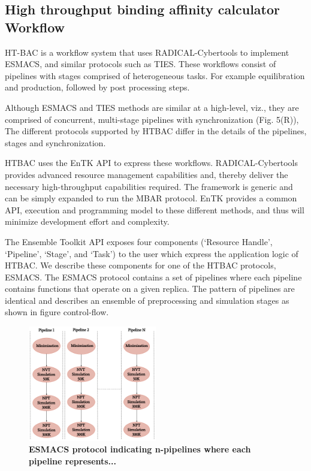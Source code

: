 \subsection{High throughput binding affinity calculator Workflow}


HT-BAC is a workflow system that uses RADICAL-Cybertools to implement ESMACS,
and similar protocols such as TIES. These workflows consist of pipelines with
stages comprised of heterogeneous tasks. For example equilibration and
production, followed by post processing steps. 

Although ESMACS and TIES methods are similar at a high-level, viz., they are
comprised of concurrent, multi-stage pipelines with synchronization (Fig.
5(R)), The different protocols supported by HTBAC differ in the details of the
pipelines, stages and synchronization.

HTBAC uses the EnTK API to express these workflows. RADICAL-Cybertools
provides advanced resource management capabilities and, thereby deliver the
necessary high-throughput capabilities required. The framework is generic and
can be simply expanded to run the MBAR protocol. EnTK provides a common API,
execution and programming model to these different methods, and thus will
minimize development effort and complexity.

The Ensemble Toolkit API exposes four components (‘Resource
Handle’, ‘Pipeline’, ‘Stage’, and ‘Task') to the user which express the
application logic of HTBAC. We describe these components for one of the HTBAC
protocols, ESMACS. The ESMACS protocol contains a set of pipelines where each
pipeline contains functions that operate on a given replica. The pattern of
pipelines are identical and describes an ensemble of preprocessing and
simulation stages as shown in figure control-flow.

\begin{figure}[ht]
\centering
  \includegraphics[width=0.5\textwidth]{FIGURES/HT-BAC-NAMD-pipelines-control-flow-only.pdf}
  \caption{\bf ESMACS protocol indicating n-pipelines where each pipeline represents...}
   \label{figure:ESMACS-pipelines}
\end{figure}

